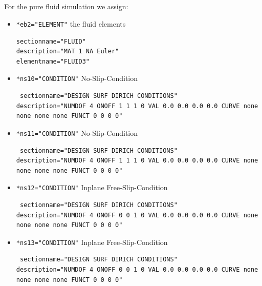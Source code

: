 \subsection{\bc}
For the pure fluid simulation we assign:

\begin{itemize}
 \item \verb|*eb2="ELEMENT"| \qquad the fluid elements
 \begin{small} \begin{verbatim}
sectionname="FLUID"
description="MAT 1 NA Euler"
elementname="FLUID3"
\end{verbatim} \end{small}


 \item \verb|*ns10="CONDITION"| \qquad No-Slip-Condition
\begin{small} \begin{verbatim} sectionname="DESIGN SURF DIRICH CONDITIONS"
description="NUMDOF 4 ONOFF 1 1 1 0 VAL 0.0 0.0 0.0 0.0 CURVE none none none none FUNCT 0 0 0 0"
\end{verbatim} \end{small}

 \item \verb|*ns11="CONDITION"| \qquad No-Slip-Condition
\begin{small} \begin{verbatim} sectionname="DESIGN SURF DIRICH CONDITIONS"
description="NUMDOF 4 ONOFF 1 1 1 0 VAL 0.0 0.0 0.0 0.0 CURVE none none none none FUNCT 0 0 0 0"
\end{verbatim} \end{small}

 \item \verb|*ns12="CONDITION"| \qquad Inplane Free-Slip-Condition
\begin{small} \begin{verbatim} sectionname="DESIGN SURF DIRICH CONDITIONS"
description="NUMDOF 4 ONOFF 0 0 1 0 VAL 0.0 0.0 0.0 0.0 CURVE none none none none FUNCT 0 0 0 0"
\end{verbatim} \end{small}

 \item \verb|*ns13="CONDITION"| \qquad Inplane Free-Slip-Condition
\begin{small} \begin{verbatim} sectionname="DESIGN SURF DIRICH CONDITIONS"
description="NUMDOF 4 ONOFF 0 0 1 0 VAL 0.0 0.0 0.0 0.0 CURVE none none none none FUNCT 0 0 0 0"
\end{verbatim} \end{small}


\end{itemize}
